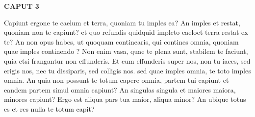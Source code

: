 \documentclass{article}
\begin{document}
      \pstart  \begin{Large}\textbf{CAPUT 3}\end{Large}
    \pend
    \vspace{0.1cm}  
      \pstart Capiunt ergone te caelum et terra, quoniam tu imples ea? An imples et restat, quoniam non te capiunt? et quo refundis quidquid impleto caeloet terra  restat ex te? An non opus habes, ut quoquam continearis, qui contines omnia, quoniam quae imples continendo ?  Non enim vasa, quae te plena sunt, stabilem te faciunt, quia etsi frangantur non effunderis. Et cum effunderis super nos, non tu iaces, sed erigis nos, nec tu dissiparis, sed colligis nos. sed quae imples omnia, te toto imples omnia. An quia non possunt te totum capere omnia, partem tui capiunt et eandem partem simul omnia capiunt? An singulas singula et maiores maiora, minores   capiunt? Ergo est aliqua pars tua maior, aliqua minor? An ubique totus es et res nulla te totum capit?  
      \pend \vspace{0.1cm} 
      \endnumbering 
       
\end{document}
